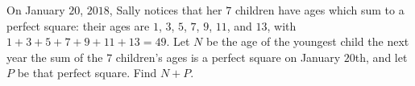 On January $20$, $2018$, Sally notices that her $7$ children have ages which sum to a perfect square: their ages are $1$, $3$, $5$, $7$, $9$, $11$, and $13$, with $1+3+5+7+9+11+13=49$. Let $N$ be the age of the youngest child the next year the sum of the $7$ children's ages is a perfect square on January $20$th, and let $P$ be that perfect square. Find $N+P$.